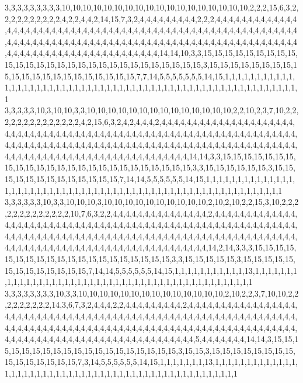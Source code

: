 3,3,3,3,3,3,3,3,3,10,10,10,10,10,10,10,10,10,10,10,10,10,10,10,10,10,10,2,2,2,15,6,3,2,2,2,2,2,2,2,2,2,2,4,2,2,4,4,2,14,15,7,3,2,4,4,4,4,4,4,4,4,4,2,2,2,4,4,4,4,4,4,4,4,4,4,4,4,4,4,4,4,4,4,4,4,4,4,4,4,4,4,4,4,4,4,4,4,4,4,4,4,4,4,4,4,4,4,4,4,4,4,4,4,4,4,4,4,4,4,4,4,4,4,4,4,4,4,4,4,4,4,4,4,4,4,4,4,4,4,4,4,4,4,4,4,4,4,4,4,4,4,4,4,4,4,4,4,4,4,4,4,4,4,4,4,4,4,4,4,4,4,4,4,4,4,4,4,4,4,4,4,4,4,4,4,4,4,4,4,4,4,4,4,4,14,14,10,3,3,15,15,15,15,15,15,15,15,15,15,15,15,15,15,15,15,15,15,15,15,15,15,15,15,15,15,15,15,3,15,15,15,15,15,15,15,15,15,15,15,15,15,15,15,15,15,15,15,15,15,7,7,14,5,5,5,5,5,5,5,14,15,1,1,1,1,1,1,1,1,1,1,1,1,1,1,1,1,1,1,1,1,1,1,1,1,1,1,1,1,1,1,1,1,1,1,1,1,1,1,1,1,1,1,1,1,1,1,1,1,1,1,1,1,1,1,1,1,1,1
3,3,3,3,3,10,3,10,10,3,3,10,10,10,10,10,10,10,10,10,10,10,10,10,10,2,2,10,2,3,7,10,2,2,2,2,2,2,2,2,2,2,2,2,2,2,4,2,15,6,3,2,4,2,4,4,4,2,4,4,4,4,4,4,4,4,4,4,4,4,4,4,4,4,4,4,4,4,4,4,4,4,4,4,4,4,4,4,4,4,4,4,4,4,4,4,4,4,4,4,4,4,4,4,4,4,4,4,4,4,4,4,4,4,4,4,4,4,4,4,4,4,4,4,4,4,4,4,4,4,4,4,4,4,4,4,4,4,4,4,4,4,4,4,4,4,4,4,4,4,4,4,4,4,4,4,4,4,4,4,4,4,4,4,4,4,4,4,4,4,4,4,4,4,4,4,4,4,4,4,4,4,4,4,4,4,4,4,4,4,4,4,4,4,4,4,4,4,4,4,14,14,3,3,15,15,15,15,15,15,15,15,15,15,15,15,15,15,15,15,15,15,15,15,15,15,15,15,15,3,3,15,15,15,15,15,15,3,15,15,15,15,15,15,15,15,15,15,15,15,15,7,14,14,5,5,5,5,5,5,14,15,1,1,1,1,1,1,1,1,1,1,1,1,1,1,1,1,1,1,1,1,1,1,1,1,1,1,1,1,1,1,1,1,1,1,1,1,1,1,1,1,1,1,1,1,1,1,1,1,1,1,1,1,1,1,1,1,1,1
3,3,3,3,3,3,10,3,3,10,10,10,3,10,10,10,10,10,10,10,10,10,10,2,10,2,10,2,2,15,3,10,2,2,2,2,2,2,2,2,2,2,2,2,2,10,7,6,3,2,2,4,4,4,4,4,4,4,4,4,4,4,4,4,4,4,2,4,4,4,4,4,4,4,4,4,4,4,4,4,4,4,4,4,4,4,4,4,4,4,4,4,4,4,4,4,4,4,4,4,4,4,4,4,4,4,4,4,4,4,4,4,4,4,4,4,4,4,4,4,4,4,4,4,4,4,4,4,4,4,4,4,4,4,4,4,4,4,4,4,4,4,4,4,4,4,4,4,4,4,4,4,4,4,4,4,4,4,4,4,4,4,4,4,4,4,4,4,4,4,4,4,4,4,4,4,4,4,4,4,4,4,4,4,4,4,4,4,4,4,4,4,4,4,4,4,4,4,4,4,4,4,4,4,14,2,14,3,3,3,15,15,15,15,15,15,15,15,15,15,15,15,15,15,15,15,15,15,15,15,3,3,15,15,15,15,15,3,15,15,15,15,15,15,15,15,15,15,15,15,15,7,14,14,5,5,5,5,5,5,14,15,1,1,1,1,1,1,1,1,1,1,1,13,1,1,1,1,1,1,1,1,1,1,1,1,1,1,1,1,1,1,1,1,1,1,1,1,1,1,1,1,1,1,1,1,1,1,1,1,1,1,1,1,1,1,1,1,1,1
3,3,3,3,3,3,3,3,10,3,3,10,10,10,10,10,10,10,10,10,10,10,10,10,10,2,10,2,2,3,7,10,10,2,2,2,2,2,2,2,2,2,14,3,6,7,3,2,4,4,4,2,2,4,4,4,4,4,4,4,4,4,2,4,4,4,4,4,4,4,4,4,4,4,4,4,4,4,4,4,4,4,4,4,4,4,4,4,4,4,4,4,4,4,4,4,4,4,4,4,4,4,4,4,4,4,4,4,4,4,4,4,4,4,4,4,4,4,4,4,4,4,4,4,4,4,4,4,4,4,4,4,4,4,4,4,4,4,4,4,4,4,4,4,4,4,4,4,4,4,4,4,4,4,4,4,4,4,4,4,4,4,4,4,4,4,4,4,4,4,4,4,4,4,4,4,4,4,4,4,4,4,4,4,4,4,4,4,4,4,4,4,4,4,4,4,4,4,4,4,4,4,5,4,4,4,4,4,4,4,14,14,3,15,15,15,15,15,15,15,15,15,15,15,15,15,15,15,15,15,15,15,3,15,15,3,15,15,15,15,15,15,15,15,15,15,15,15,15,15,15,7,3,14,5,5,5,5,5,5,14,15,1,1,1,1,1,1,1,13,1,1,1,1,1,1,1,1,1,1,1,1,1,1,1,1,1,1,1,1,1,1,1,1,1,1,1,1,1,1,1,1,1,1,1,1,1,1,1,1,1,1,1,1,1,1,1,1,1,1
